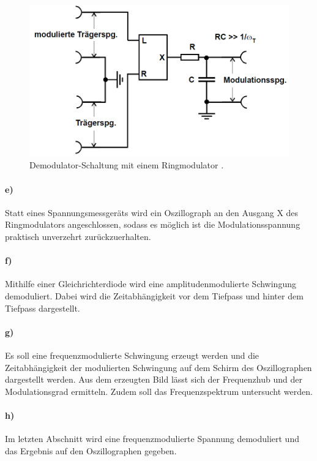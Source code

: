 \begin{figure}[!h]
    \centering
    \includegraphics[width = 14cm]{images/adm_ringmodulator.png}
    \caption{Demodulator-Schaltung mit einem Ringmodulator \cite{V59}.}
    \label{fig:am-schaltung-demodulation}
\end{figure}

\paragraph{e)} 
\label{par:e_}
Statt eines Spannungsmessgeräts wird ein Oszillograph an den Ausgang X des Ringmodulators angeschlossen, sodass es möglich ist die Modulationsspannung praktisch unverzehrt zurückzuerhalten.

\paragraph{f)} %
\label{par:g}
Mithilfe einer Gleichrichterdiode wird eine amplitudenmodulierte Schwingung demoduliert.
Dabei wird die Zeitabhängigkeit vor dem Tiefpass und hinter dem Tiefpass dargestellt.

\paragraph{g)} %
\label{par:g_}
Es soll eine frequenzmodulierte Schwingung erzeugt werden und die Zeitabhängigkeit der modulierten Schwingung auf dem Schirm des Oszillographen dargestellt werden.
Aus dem erzeugten Bild lässt sich der Frequenzhub und der Modulationsgrad ermitteln.
Zudem soll das Frequenzspektrum untersucht werden.

\paragraph{h)} %
\label{par:h_}
Im letzten Abschnitt wird eine frequenzmodulierte Spannung demoduliert und das Ergebnis auf den Oszillographen gegeben.
